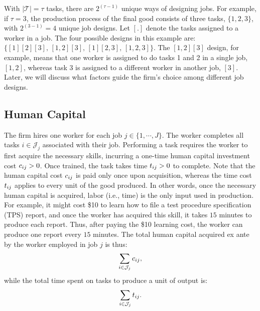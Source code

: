 \documentclass{article}
\theoremstyle{plain}
\theoremstyle{plain}
\begin{document}
With $|\mathcal{T}| = \tau$ tasks, there are $2^{(\tau - 1)}$ unique ways of designing jobs.
For example, if $\tau = 3$, the production process of the final good consists of three tasks, $\{1,2,3\}$, with $2^{(3-1)}=4$ unique job designs.
Let $[.]$ denote the tasks assigned to a worker in a job.
The four possible designs in this example are: $\{[1][2][3], \, [1,2][3], \, [1][2,3], \, [1,2,3]\}$.
The $[1,2][3]$ design, for example, means that one worker is assigned to do tasks 1 and 2 in a single job, $[1,2]$, whereas task 3 is assigned to a different worker in another job, $[3]$.
Later, we will discuss what factors guide the firm’s choice among different job designs.


\subsection{Human Capital}
The firm hires one worker for each job $j \in \{1, \cdots, J\}$.  
The worker completes all tasks $i \in \mathcal{J}_j$ associated with their job. 
Performing a task requires the worker to first acquire the necessary skills, incurring a one-time human capital investment cost \( c_{ij} > 0 \).
Once trained, the task takes time $t_{ij}>0$ to complete. 
Note that the human capital cost $c_{ij}$ is paid only once upon acquisition, whereas the time cost $t_{ij}$ applies to every unit of the good produced.
In other words, once the necessary human capital is acquired, labor (i.e., time) is the only input used in production.
For example, it might cost \$10 to learn how to file a test procedure specification (TPS) report, and once the worker has acquired this skill, it takes $15$ minutes to produce each report.
Thus, after paying the \$10 learning cost, the worker can produce one report every $15$ minutes.
The total human capital acquired ex ante by the worker employed in job $j$ is thus:
\[
\sum_{i \in \mathcal{J}_j} c_{ij},
\]
while the total time spent on tasks to produce a unit of output is:
\[
\sum_{i \in \mathcal{J}_j} t_{ij}.
\]
\end{document}
